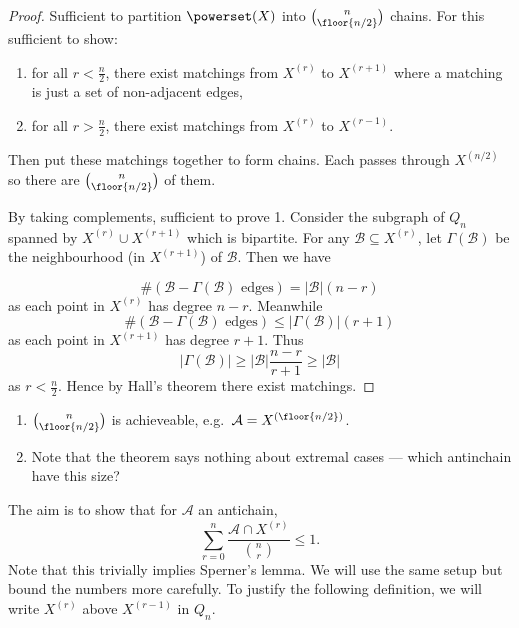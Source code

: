 \documentclass[a4paper]{article}
\begin{document}
\begin{proof}
  Sufficient to partition \(\powerset(X)\) into \(\binom{n}{\floor{n/2}}\) chains. For this sufficient to show:
  \begin{enumerate}
  \item for all \(r < \frac{n}{2}\), there exist matchings from \(X^{(r)}\) to \(X^{(r + 1)}\) where a matching is just a set of non-adjacent edges,
  \item for all \(r > \frac{n}{2}\), there exist matchings from \(X^{(r)}\) to \(X^{(r - 1)}\).
  \end{enumerate}
  Then put these matchings together to form chains. Each passes through \(X^{(n/2)}\) so there are \(\binom{n}{\floor{n/2}}\) of them.

  By taking complements, sufficient to prove 1. Consider the subgraph of \(Q_n\) spanned by \(X^{(r)} \cup X^{(r + 1)}\) which is bipartite. For any \(\mathcal B \subseteq X^{(r)}\), let \(\Gamma(\mathcal B)\) be the neighbourhood (in \(X^{(r + 1)}\)) of \(\mathcal B\). Then we have

  \[
    \# (\mathcal B - \Gamma(\mathcal B) \text{ edges}) = |\mathcal B| (n - r)
  \]
  as each point in \(X^{(r)}\) has degree \(n - r\). Meanwhile
  \[
    \# (\mathcal B - \Gamma(\mathcal B) \text{ edges}) \leq |\Gamma(\mathcal B)| (r + 1)
  \]
  as each point in \(X^{(r + 1)}\) has degree \(r + 1\). Thus
  \[
    |\Gamma(\mathcal B)| \geq |\mathcal B| \frac{n - r}{r + 1} \geq |\mathcal B|
  \]
  as \(r < \frac{n}{2}\). Hence by Hall's theorem there exist matchings.
\end{proof}

\begin{remark}\leavevmode
  \begin{enumerate}
  \item \(\binom{n}{\floor{n/2}}\) is achieveable, e.g.\ \(\mathcal A = X^{(\floor{n/2})}\).
  \item Note that the theorem says nothing about extremal cases --- which antinchain have this size?
  \end{enumerate}
\end{remark}

The aim is to show that for \(\mathcal A\) an antichain,
\[
  \sum_{r = 0}^n \frac{\mathcal A \cap X^{(r)}}{\binom{n}{r}} \leq 1.
\]
Note that this trivially implies Sperner's lemma. We will use the same setup but bound the numbers more carefully. To justify the following definition, we will write \(X^{(r)}\) above \(X^{(r - 1)}\) in \(Q_n\).
\end{document}
